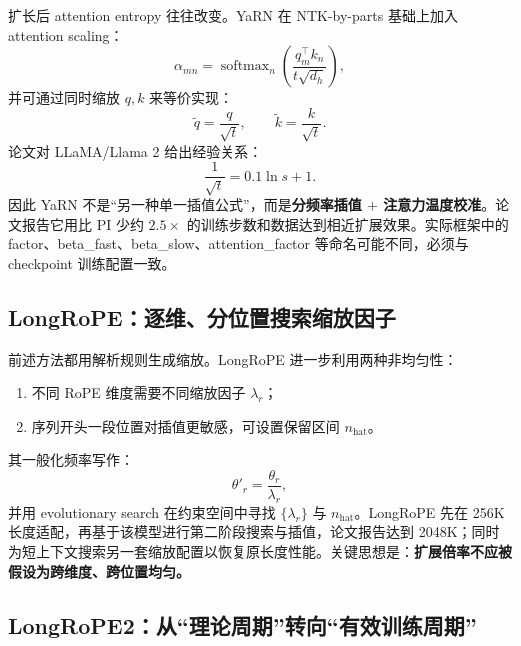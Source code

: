 \documentclass[UTF8,fontset=none,a4paper,10pt]{ctexart}
\newcommand{\term}[1]{\textbf{#1}}
\newcommand{\softmax}{\operatorname{softmax}}
\begin{document}
扩长后 attention entropy 往往改变。YaRN 在 NTK-by-parts 基础上加入 attention scaling\cite{peng2024yarn}：
\begin{equation}
  \alpha_{mn}=\softmax_n\!\left(
  \frac{q_m^\top k_n}{t\sqrt{d_h}}
  \right),
  \label{eq:yarn-temperature}
\end{equation}
并可通过同时缩放 $q,k$ 来等价实现：
\begin{equation}
  \tilde q=\frac{q}{\sqrt{t}},\qquad
  \tilde k=\frac{k}{\sqrt{t}}.
  \label{eq:yarn-qk-scale}
\end{equation}
论文对 LLaMA/Llama 2 给出经验关系：
\begin{equation}
  \frac{1}{\sqrt{t}}=0.1\ln s+1.
  \label{eq:yarn-fit}
\end{equation}
因此 YaRN 不是“另一种单一插值公式”，而是\term{分频率插值 $+$ 注意力温度校准}。论文报告它用比 PI 少约 $2.5\times$ 的训练步数和数据达到相近扩展效果\cite{peng2024yarn}。实际框架中的 \textnormal{factor}、\textnormal{beta\_fast}、\textnormal{beta\_slow}、\textnormal{attention\_factor} 等命名可能不同，必须与 checkpoint 训练配置一致。

\subsection{LongRoPE：逐维、分位置搜索缩放因子}

前述方法都用解析规则生成缩放。LongRoPE 进一步利用两种非均匀性\cite{ding2024longrope}：
\begin{enumerate}
  \item 不同 RoPE 维度需要不同缩放因子 $\lambda_r$；
  \item 序列开头一段位置对插值更敏感，可设置保留区间 $n_{\mathrm{hat}}$。
\end{enumerate}
其一般化频率写作：
\begin{equation}
  \theta'_r=\frac{\theta_r}{\lambda_r},
  \label{eq:longrope-scale}
\end{equation}
并用 evolutionary search 在约束空间中寻找 $\{\lambda_r\}$ 与 $n_{\mathrm{hat}}$。LongRoPE 先在 256K 长度适配，再基于该模型进行第二阶段搜索与插值，论文报告达到 2048K；同时为短上下文搜索另一套缩放配置以恢复原长度性能\cite{ding2024longrope}。关键思想是：\term{扩展倍率不应被假设为跨维度、跨位置均匀。}

\subsection{LongRoPE2：从“理论周期”转向“有效训练周期”}
\end{document}
